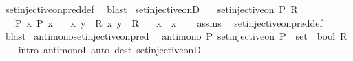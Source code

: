 \begin{isabellebody}
\ set{\isacharunderscore}{\kern0pt}injective{\isacharunderscore}{\kern0pt}on{\isacharunderscore}{\kern0pt}pred{\isacharunderscore}{\kern0pt}def\ \isamarkupfalse%
\ blast%
\endisatagproof
{\isafoldproof}%
%
\isadelimproof
\isanewline
%
\endisadelimproof
\isanewline
{}\isamarkupfalse%
\ set{\isacharunderscore}{\kern0pt}injective{\isacharunderscore}{\kern0pt}onD{\isacharcolon}{\kern0pt}\isanewline
\ \ \ {\isachardoublequoteopen}set{\isacharunderscore}{\kern0pt}injective{\isacharunderscore}{\kern0pt}on\ P\ R{\isachardoublequoteclose}\isanewline
\ \ \ {\isachardoublequoteopen}P\ x{\isachardoublequoteclose}\ {\isachardoublequoteopen}P\ x{\isacharprime}{\kern0pt}{\isachardoublequoteclose}\isanewline
\ \ \ {\isachardoublequoteopen}{\isasymlangle}x{\isacharcomma}{\kern0pt}\ y{\isasymrangle}\ {\isasymin}\ R{\isachardoublequoteclose}\ {\isachardoublequoteopen}{\isasymlangle}x{\isacharprime}{\kern0pt}{\isacharcomma}{\kern0pt}\ y{\isasymrangle}\ {\isasymin}\ R{\isachardoublequoteclose}\isanewline
\ \ \ {\isachardoublequoteopen}x\ {\isacharequal}{\kern0pt}\ x{\isacharprime}{\kern0pt}{\isachardoublequoteclose}\isanewline
%
\isadelimproof
\ \ %
\endisadelimproof
%
\isatagproof
{}\isamarkupfalse%
\ assms\ \isamarkupfalse%
\ set{\isacharunderscore}{\kern0pt}injective{\isacharunderscore}{\kern0pt}on{\isacharunderscore}{\kern0pt}pred{\isacharunderscore}{\kern0pt}def\ \isamarkupfalse%
\ blast%
\endisatagproof
{\isafoldproof}%
%
\isadelimproof
\isanewline
%
\endisadelimproof
\isanewline
{}\isamarkupfalse%
\ antimono{\isacharunderscore}{\kern0pt}set{\isacharunderscore}{\kern0pt}injective{\isacharunderscore}{\kern0pt}on{\isacharunderscore}{\kern0pt}pred{\isacharcolon}{\kern0pt}\isanewline
\ \ {\isachardoublequoteopen}antimono\ {\isacharparenleft}{\kern0pt}{\isasymlambda}P{\isachardot}{\kern0pt}\ set{\isacharunderscore}{\kern0pt}injective{\isacharunderscore}{\kern0pt}on\ {\isacharparenleft}{\kern0pt}P\ {\isacharcolon}{\kern0pt}{\isacharcolon}{\kern0pt}\ set\ {\isasymRightarrow}\ bool{\isacharparenright}{\kern0pt}\ R{\isacharparenright}{\kern0pt}{\isachardoublequoteclose}\isanewline
%
\isadelimproof
\ \ %
\endisadelimproof
%
\isatagproof
{}\isamarkupfalse%
\ {\isacharparenleft}{\kern0pt}intro\ antimonoI{\isacharparenright}{\kern0pt}\ {\isacharparenleft}{\kern0pt}auto\ dest{\isacharcolon}{\kern0pt}\ set{\isacharunderscore}{\kern0pt}injective{\isacharunderscore}{\kern0pt}onD{\isacharparenright}{\kern0pt}%

\end{isabellebody}

